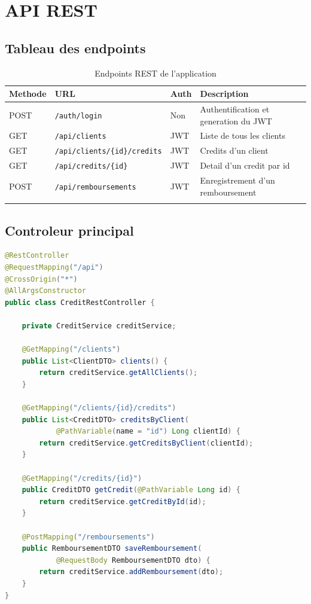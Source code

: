 \documentclass[12pt,a4paper]{report}
\begin{document}
\chapter{API REST}

\section{Tableau des endpoints}

\begin{longtable}{l l l p{5.5cm}}
\toprule
\textbf{Methode} & \textbf{URL}
    & \textbf{Auth} & \textbf{Description} \\
\midrule
\endhead
POST & \texttt{/auth/login}                & Non & Authentification et generation du JWT \\
GET  & \texttt{/api/clients}               & JWT & Liste de tous les clients \\
GET  & \texttt{/api/clients/\{id\}/credits}& JWT & Credits d'un client \\
GET  & \texttt{/api/credits/\{id\}}        & JWT & Detail d'un credit par id \\
POST & \texttt{/api/remboursements}         & JWT & Enregistrement d'un remboursement \\
\bottomrule
\caption{Endpoints REST de l'application}
\end{longtable}

\section{Controleur principal}

\begin{lstlisting}[language=Java, caption={CreditRestController}]
@RestController
@RequestMapping("/api")
@CrossOrigin("*")
@AllArgsConstructor
public class CreditRestController {

    private CreditService creditService;

    @GetMapping("/clients")
    public List<ClientDTO> clients() {
        return creditService.getAllClients();
    }

    @GetMapping("/clients/{id}/credits")
    public List<CreditDTO> creditsByClient(
            @PathVariable(name = "id") Long clientId) {
        return creditService.getCreditsByClient(clientId);
    }

    @GetMapping("/credits/{id}")
    public CreditDTO getCredit(@PathVariable Long id) {
        return creditService.getCreditById(id);
    }

    @PostMapping("/remboursements")
    public RemboursementDTO saveRemboursement(
            @RequestBody RemboursementDTO dto) {
        return creditService.addRemboursement(dto);
    }
}
\end{lstlisting}
\end{document}

